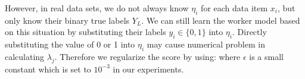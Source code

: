 However, in real data sets, we do not always know $\eta_i$ for each data item $x_i$, 
but only know their binary true labels $Y_L$.  
We can still learn the worker model based on this situation 
by substituting their labels $y_i \in \{0, 1\}$ into $\eta_i$.  
Directly substituting the value of 0 or 1 into $\eta_i$ may cause numerical problem in calculating $\lambda_j$.  
Therefore we regularize the score by using: 
%
where $\epsilon$ is a small constant which is set to $10^{-3}$ in our experiments.  





